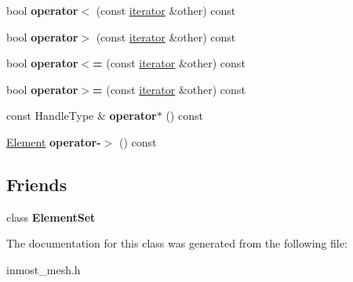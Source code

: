 \begin{DoxyCompactItemize}
\item 
\hypertarget{classINMOST_1_1ElementSet_1_1iterator_a6afc6948cd18e7600e638b6a9b2206d5}{bool {\bfseries operator$<$} (const \hyperlink{classINMOST_1_1ElementSet_1_1iterator}{iterator} \&other) const }\label{classINMOST_1_1ElementSet_1_1iterator_a6afc6948cd18e7600e638b6a9b2206d5}

\item 
\hypertarget{classINMOST_1_1ElementSet_1_1iterator_ad1134752a9c168d00a5e46c9866b6217}{bool {\bfseries operator$>$} (const \hyperlink{classINMOST_1_1ElementSet_1_1iterator}{iterator} \&other) const }\label{classINMOST_1_1ElementSet_1_1iterator_ad1134752a9c168d00a5e46c9866b6217}

\item 
\hypertarget{classINMOST_1_1ElementSet_1_1iterator_ac974374d5fc080d2b9292ba11d6a729c}{bool {\bfseries operator$<$=} (const \hyperlink{classINMOST_1_1ElementSet_1_1iterator}{iterator} \&other) const }\label{classINMOST_1_1ElementSet_1_1iterator_ac974374d5fc080d2b9292ba11d6a729c}

\item 
\hypertarget{classINMOST_1_1ElementSet_1_1iterator_a79bd5aaf9e273eb4be4436647e56c8a8}{bool {\bfseries operator$>$=} (const \hyperlink{classINMOST_1_1ElementSet_1_1iterator}{iterator} \&other) const }\label{classINMOST_1_1ElementSet_1_1iterator_a79bd5aaf9e273eb4be4436647e56c8a8}

\item 
\hypertarget{classINMOST_1_1ElementSet_1_1iterator_abf18785498ca81cea90c811afb7c2899}{const Handle\-Type \& {\bfseries operator$\ast$} () const }\label{classINMOST_1_1ElementSet_1_1iterator_abf18785498ca81cea90c811afb7c2899}

\item 
\hypertarget{classINMOST_1_1ElementSet_1_1iterator_aaa9ccdabd1b9d4aaf2d7c779a953e972}{\hyperlink{classINMOST_1_1Element}{Element} {\bfseries operator-\/$>$} () const }\label{classINMOST_1_1ElementSet_1_1iterator_aaa9ccdabd1b9d4aaf2d7c779a953e972}

\end{DoxyCompactItemize}
\subsection*{Friends}
\begin{DoxyCompactItemize}
\item 
\hypertarget{classINMOST_1_1ElementSet_1_1iterator_a63b4eace9ae04475f3446d355625bb65}{class {\bfseries Element\-Set}}\label{classINMOST_1_1ElementSet_1_1iterator_a63b4eace9ae04475f3446d355625bb65}

\end{DoxyCompactItemize}


The documentation for this class was generated from the following file\-:\begin{DoxyCompactItemize}
\item 
inmost\-\_\-mesh.\-h\end{DoxyCompactItemize}
